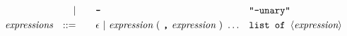 \begin{alignat*}{9}
&& 
                        && | &\quad && \textbf{\texttt{-}}
                        && \texttt{"-unary"} \\
&& \textit{expressions}  && ::= &\quad && \epsilon\ | \ \textit{expression}\ (
                                                               \ \textbf{\texttt{,}} \
                                                                 \textit{expression} \ 
                                                                      )\ \ldots
                                                            && \texttt{list of  } \langle \textit{expression}\rangle  \\
\end{alignat*}



\newpage
{}
\recalctypearea

